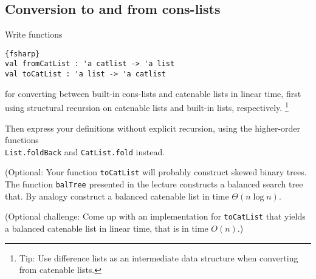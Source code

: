 \subsection*{Conversion to and from cons-lists}

Write functions
\begin{lstlisting}{fsharp}
val fromCatList : 'a catlist -> 'a list
val toCatList : 'a list -> 'a catlist
\end{lstlisting}
for converting between built-in cons-lists and catenable lists in linear time, first using structural recursion on catenable lists and built-in lists, respectively.
\footnote{Tip: Use difference lists as an intermediate data structure when converting from catenable lists.}

Then express your definitions without explicit recursion, using the higher-order functions \\ \texttt{List.foldBack} and \texttt{CatList.fold} instead.

(Optional: Your function \verb|toCatList| will probably construct skewed binary trees.  The function \verb|balTree| presented in the lecture constructs a balanced search tree that.  By analogy construct a balanced catenable list in time $\Theta(n \log n)$.  

(Optional challenge: Come up with an implementation for \verb|toCatList| that yields a balanced catenable list in linear time, that is in time $O(n)$.)
